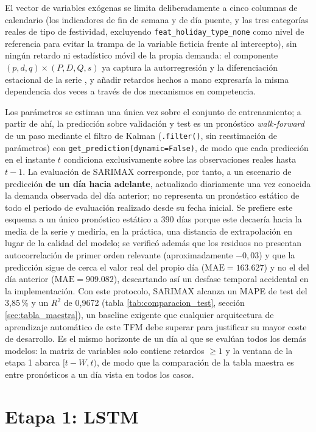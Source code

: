 El vector de variables exógenas se limita deliberadamente a cinco columnas de calendario
(los indicadores de fin de semana y de día puente, y las tres categorías reales de tipo
de festividad, excluyendo \texttt{feat\_holiday\_type\_none} como nivel de referencia para
evitar la trampa de la variable ficticia frente al intercepto), sin ningún retardo ni
estadístico móvil de la propia demanda: el componente $(p,d,q)\times(P,D,Q,s)$ ya captura
la autorregresión y la diferenciación estacional de la serie \parencite{box1970time}, y
añadir retardos hechos a mano expresaría la misma dependencia dos veces a través de dos
mecanismos en competencia.

Los parámetros se estiman una única vez sobre el conjunto de entrenamiento; a partir de
ahí, la predicción sobre validación y test es un pronóstico \emph{walk-forward} de un paso
mediante el filtro de Kalman (\texttt{.filter()}, sin reestimación de parámetros) con
\texttt{get\_prediction(dynamic=False)}, de modo que cada predicción en el instante $t$
condiciona exclusivamente sobre las observaciones reales hasta $t-1$. La evaluación de
SARIMAX corresponde, por tanto, a un escenario de predicción \textbf{de un día hacia
adelante}, actualizado diariamente una vez conocida la demanda observada del día anterior;
no representa un pronóstico estático de todo el periodo de evaluación realizado desde su
fecha inicial. Se prefiere este esquema a un único pronóstico estático a 390 días porque este decaería
hacia la media de la serie y mediría, en la práctica, una distancia de extrapolación en
lugar de la calidad del modelo; se verificó además que los residuos no presentan
autocorrelación de primer orden relevante (aproximadamente $-0{,}03$) y que la predicción
sigue de cerca el valor real del propio día ($\text{MAE}=163.627$) y no el del día
anterior ($\text{MAE}=909.082$), descartando así un desfase temporal accidental en la
implementación. Con este protocolo, SARIMAX alcanza un MAPE de test del 3,85\,\% y un
$R^2$ de 0,9672 (tabla \ref{tab:comparacion_test}, sección \ref{sec:tabla_maestra}), un
baseline exigente que cualquier arquitectura de aprendizaje automático de este TFM debe
superar para justificar su mayor coste de desarrollo. Es el mismo horizonte de un día al
que se evalúan todos los demás modelos: la matriz de variables solo contiene retardos
$\geq 1$ y la ventana de la etapa 1 abarca $[t-W, t)$, de modo que la comparación de la
tabla maestra es entre pronósticos a un día vista en todos los casos.

\section{Etapa 1: LSTM}\label{sec:etapa1_lstm}

